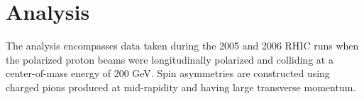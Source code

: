 \chapter{Analysis}

The analysis encompasses data taken during the 2005 and 2006 RHIC runs when
the polarized proton beams were longitudinally polarized and colliding at a
center-of-mass energy of 200 GeV. Spin asymmetries are constructed using
charged pions produced at mid-rapidity and having large transverse momentum.







